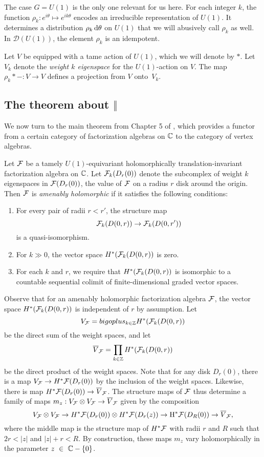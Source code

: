 The case $G = U(1)$ is the only one relevant for us here. 
For each integer $k$, the function $\rho_k: e^{i\theta} \mapsto e^{ik\theta}$ encodes an irreducible representation of $U(1)$.
It determines a distribution $\rho_k \, {\rm d} \theta$ on $U(1)$ that we will abusively call $\rho_k$ as well.
In $\mathcal{D}(U(1))$, the element $\rho_k$  is an idempotent.

\begin{dfn}
Let $V$ be equipped with a tame action of $U(1)$, which we will denote by $\ast$. 
Let $V_k$ denote the {\em weight $k$ eigenspace} for the $U(1)$-action on $V$.
The map $\rho_k \ast - : V \to V$ defines a projection from $V$ onto~$V_k$. 
\end{dfn}

\subsection{The theorem about $\Vert$}

We now turn to the main theorem from Chapter 5 of \cite{CG1}, 
which provides a functor from a certain category of factorization algebras on $\mathbb C$ to the category of vertex algebras.

\begin{dfn}
Let $\mathcal F$ be a tamely $U(1)$-equivariant holomorphically translation-invariant factorization algebra on $\mathbb C$.
Let $\mathcal F_k(D_r(0))$ denote the subcomplex of weight $k$ eigenspaces in $\mathcal F(D_r(0))$, 
the value of $\mathcal F$ on a radius $r$ disk around the origin.
Then $\mathcal F$ is {\em amenably holomorphic} if it satisfies the following conditions:
\begin{enumerate}
\item 
For every pair of radii $r < r'$, the structure map
$$
\mathcal F_k(D(0,r)) \to \mathcal F_k(D(0,r'))
$$
is a quasi-isomorphism.
\item For $k \gg 0$, the vector space $H^\ast (\mathcal F_k(D(0,r))$ is zero.  
\item For each $k$ and $r$, we require that $H^\ast(\mathcal F_k(D(0,r) )$ is isomorphic to a countable sequential colimit of finite-dimensional graded vector spaces. 
\end{enumerate}
\end{dfn}

Observe that for an amenably holomorphic factorization algebra $\mathcal F$, 
the vector space $H^* (\mathcal F_k(D(0,r))$ is independent of $r$ by assumption.
Let 
\[
V_\mathcal F= bigoplus_{k \in \mathbb Z} H^* (\mathcal F_k(D(0,r))
\]
be the direct sum of the weight spaces, 
and let 
\[
\overline{V}_\mathcal F = \prod_{k \in \mathbb Z} H^* (\mathcal F_k(D(0,r))
\]
be the direct product of the weight spaces.
Note that for any disk $D_r(0)$, there is a map $V_\mathcal F \to H^*\mathcal F(D_r(0))$ by the inclusion of the weight spaces.
Likewise, there is map $H^*\mathcal F(D_r(0)) \to \overline{V}_\mathcal F$.
The structure maps of $\mathcal F$ thus determine a family of maps $m_z: V_\mathcal F \otimes V_\mathcal F \to \overline{V}_\mathcal F$ 
given by the composition
\[
V_\mathcal F \otimes V_\mathcal F \to H^*\mathcal F(D_r(0)) \otimes H^* \mathcal F(D_r(z)) \to {\rm H}^*\mathcal F(D_R(0)) \to \overline{V}_\mathcal F,
\]
where the middle map is the structure map of $H^* \mathcal F$ with radii $r$ and $R$ such that $2r < |z|$ and $|z| + r < R$.
By construction, these maps $m_z$ vary holomorphically in the parameter $z~\in~\mathbb C-\{0\}$.

